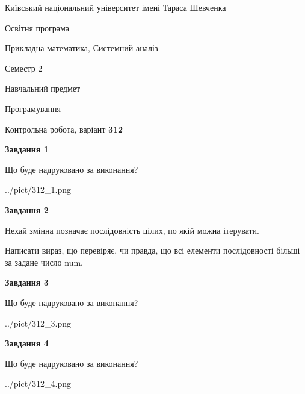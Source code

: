 \documentclass[12pt, ukrainian]{article}
\begin{document}
{{\begin {small}\par
{ \center  Київський національний університет імені Тараса Шевченка \par}
{\parbox {5 cm}{Освітня програма \hfill}{\parbox {8 cm}{Прикладна математика, Системний аналіз \hfill}}\parbox {5 cm}{\hfill Семестр 2}}\par
{\parbox {5 cm} {Навчальний предмет \hfill}\parbox {7 cm}{Програмування \hfill}\parbox {6cm}{\hfill}\par}\vspace{-7pt} \end{small}}{\center Контрольна робота, варіант  \No \textbf
{ 312 }\par}}
{
\begin {large}
{\begin {center}\textbf{Завдання 1}\end {center}}\par
Що буде надруковано за виконання?\par\par
\begin{center}
	{../pict/312_1.png}
\end{center}
\newpage

{\begin {center}\textbf{Завдання 2}\end {center}}\par
Нехай змінна  позначає послідовність цілих, по якій можна ітерувати.

Написати вираз, що перевіряє, чи правда, що всі елементи послідовності більші за задане число num.\par
\newpage

{\begin {center}\textbf{Завдання 3}\end {center}}\par
Що буде надруковано за виконання?\par
\begin{center}
	{../pict/312_3.png}
\end{center}
\newpage

{\begin {center}\textbf{Завдання 4}\end {center}}\par
Що буде надруковано за виконання?\par
\begin{center}
	{../pict/312_4.png}
\end{center}
\newpage


\end{large}}
\end{document}
